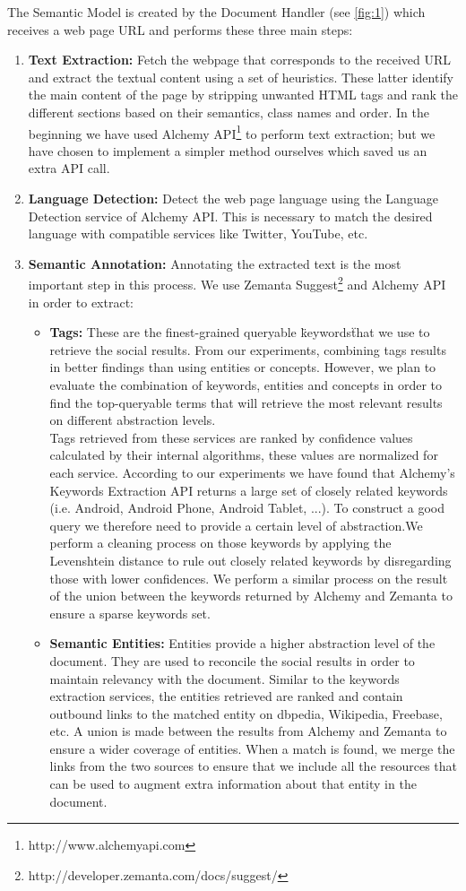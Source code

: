 \documentclass[oribibl]{llncs}
\begin{document}
The Semantic Model is created by the Document Handler (see \ref{fig:1}) which receives a web page URL and performs these three main steps:
\begin{enumerate}
\item {\bf Text Extraction:} Fetch the webpage that corresponds to the received URL and extract the textual content using a set of heuristics. These latter identify the main content of the page by stripping unwanted HTML tags and rank the different sections based on their semantics, class names and order. In the beginning we have used Alchemy API\footnote{http://www.alchemyapi.com} to perform text extraction; but we have chosen to implement a simpler method ourselves which saved us an extra API call.
\item {\bf Language Detection:} Detect the web page language using the Language Detection service of Alchemy API. This is necessary to match the desired language with compatible services like Twitter, YouTube, etc.
\item {\bf Semantic Annotation:} Annotating the extracted text is the most important step in this process. We use Zemanta Suggest\footnote{http://developer.zemanta.com/docs/suggest/} and Alchemy API in order to extract:
\begin{itemize}
\item {\bf Tags:} These are the finest-grained queryable \"keywords\" that we use to retrieve the social results. From our experiments, combining tags results in better findings than using entities or concepts. However, we plan to evaluate the combination of keywords, entities and concepts in order to find the top-queryable terms that will retrieve the most relevant results on different abstraction levels.
\\Tags retrieved from these services are ranked by confidence values calculated by their internal algorithms, these values are normalized for each service. According to our experiments we have found that Alchemy's Keywords Extraction API returns a large set of closely related keywords (i.e. Android, Android Phone, Android Tablet, ...). To construct a good query we therefore need to provide a certain level of abstraction.We perform a cleaning process on those keywords by applying the Levenshtein distance to rule out closely related keywords by disregarding those with lower confidences. We perform a similar process on the result of the union between the keywords returned by Alchemy and Zemanta to ensure a sparse keywords set.
\item {\bf Semantic Entities:} Entities provide a higher abstraction level of the document. They are used to reconcile the social results in order to maintain relevancy with the document. Similar to the keywords extraction services, the entities retrieved are ranked and contain outbound links to the matched entity on dbpedia, Wikipedia, Freebase, etc. A union is made between the results from Alchemy and Zemanta to ensure a wider coverage of entities. When a match is found, we merge the links from the two sources to ensure that we include all the resources that can be used to augment extra information about that entity in the document.

\end{itemize}
\end{enumerate}
\end{document}
